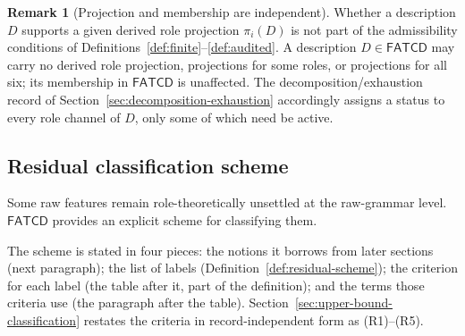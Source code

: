 \documentclass[11pt]{article}
\theoremstyle{definition}
\newtheorem{remark}[theorem]{Remark}
\newcommand{\FATCD}{\ensuremath{\mathsf{FATCD}}}
\begin{document}
\begin{remark}[Projection and membership are independent]\label{rem:projection-vs-membership}
Whether a description \(D\) supports a given derived role projection
\(\pi_i(D)\) is not part of the admissibility conditions of
Definitions~\ref{def:finite}--\ref{def:audited}. A description
\(D \in \FATCD{}\) may carry no derived role projection, projections
for some roles, or projections for all six; its membership in
\FATCD{} is unaffected. The decomposition/exhaustion record of
Section~\ref{sec:decomposition-exhaustion} accordingly assigns a
status to every role channel of \(D\), only some of which need be
active.
\end{remark}

\subsection{Residual classification scheme}\label{subsec:residual-classification}

Some raw features remain role-theoretically unsettled at the
raw-grammar level. \FATCD{} provides an explicit scheme for
classifying them.

The scheme is stated in four pieces: the notions it borrows from later
sections (next paragraph); the list of labels (Definition~\ref{def:residual-scheme});
the criterion for each label (the table after it, part of the definition); and
the terms those criteria use (the paragraph after the table).
Section~\ref{sec:upper-bound-classification} restates the criteria in
record-independent form as (R1)--(R5).
\end{document}
